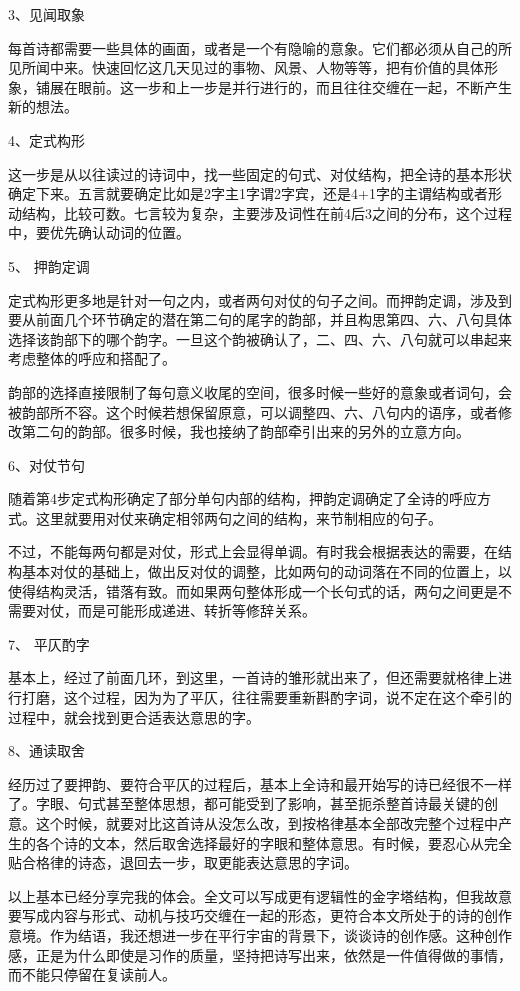 \documentclass{article}
\begin{document}
3、见闻取象

每首诗都需要一些具体的画面，或者是一个有隐喻的意象。它们都必须从自己的所见所闻中来。快速回忆这几天见过的事物、风景、人物等等，把有价值的具体形象，铺展在眼前。这一步和上一步是并行进行的，而且往往交缠在一起，不断产生新的想法。

4、定式构形

这一步是从以往读过的诗词中，找一些固定的句式、对仗结构，把全诗的基本形状确定下来。五言就要确定比如是2字主1字谓2字宾，还是4+1字的主谓结构或者形动结构，比较可数。七言较为复杂，主要涉及词性在前4后3之间的分布，这个过程中，要优先确认动词的位置。

5、 押韵定调

定式构形更多地是针对一句之内，或者两句对仗的句子之间。而押韵定调，涉及到要从前面几个环节确定的潜在第二句的尾字的韵部，并且构思第四、六、八句具体选择该韵部下的哪个韵字。一旦这个韵被确认了，二、四、六、八句就可以串起来考虑整体的呼应和搭配了。

韵部的选择直接限制了每句意义收尾的空间，很多时候一些好的意象或者词句，会被韵部所不容。这个时候若想保留原意，可以调整四、六、八句内的语序，或者修改第二句的韵部。很多时候，我也接纳了韵部牵引出来的另外的立意方向。

6、对仗节句

随着第4步定式构形确定了部分单句内部的结构，押韵定调确定了全诗的呼应方式。这里就要用对仗来确定相邻两句之间的结构，来节制相应的句子。

不过，不能每两句都是对仗，形式上会显得单调。有时我会根据表达的需要，在结构基本对仗的基础上，做出反对仗的调整，比如两句的动词落在不同的位置上，以使得结构灵活，错落有致。而如果两句整体形成一个长句式的话，两句之间更是不需要对仗，而是可能形成递进、转折等修辞关系。

7、 平仄酌字

基本上，经过了前面几环，到这里，一首诗的雏形就出来了，但还需要就格律上进行打磨，这个过程，因为为了平仄，往往需要重新斟酌字词，说不定在这个牵引的过程中，就会找到更合适表达意思的字。

8、通读取舍

经历过了要押韵、要符合平仄的过程后，基本上全诗和最开始写的诗已经很不一样了。字眼、句式甚至整体思想，都可能受到了影响，甚至扼杀整首诗最关键的创意。这个时候，就要对比这首诗从没怎么改，到按格律基本全部改完整个过程中产生的各个诗的文本，然后取舍选择最好的字眼和整体意思。有时候，要忍心从完全贴合格律的诗态，退回去一步，取更能表达意思的字词。

以上基本已经分享完我的体会。全文可以写成更有逻辑性的金字塔结构，但我故意要写成内容与形式、动机与技巧交缠在一起的形态，更符合本文所处于的诗的创作意境。作为结语，我还想进一步在平行宇宙的背景下，谈谈诗的创作感。这种创作感，正是为什么即使是习作的质量，坚持把诗写出来，依然是一件值得做的事情，而不能只停留在复读前人。
\end{document}

